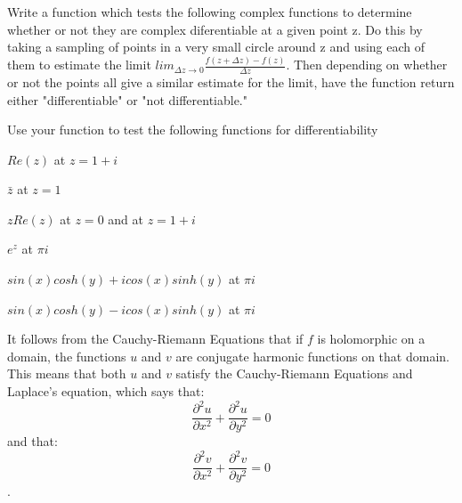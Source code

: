 \begin{problem}
Write a function which tests the following complex functions to determine whether or not they are complex diferentiable at a given point z. Do this by taking a sampling of points in a very small circle around z and using each of them to estimate the limit $lim_{\Delta z \to 0} \frac{f(z+\Delta z)-f(z)}{\Delta z}$. Then depending on whether or not the points all give a similar estimate for the limit, have the function return either "differentiable" or "not differentiable."

Use your function to test the following functions for differentiability

$Re(z)$ at $z=1+ i$

$\bar{z}$ at $z=1$

$z Re(z)$ at $z=0$ and at $z=1+ i$

$e^z$ at $\pi i$

$sin(x) cosh(y) + i cos(x) sinh(y)$ at $\pi i$

$sin(x) cosh(y) - i cos(x) sinh(y)$ at $\pi i$
\end{problem}

It follows from the Cauchy-Riemann Equations that if $f$ is holomorphic on a domain, the functions $u$ and $v$ are conjugate harmonic functions on that domain. This means that both $u$ and $v$ satisfy the Cauchy-Riemann Equations and Laplace's equation, which says that: $$\frac{\partial^2 u}{\partial x^2}+\frac{\partial^2 u}{\partial y^2}=0$$ and that: $$\frac{\partial^2 v}{\partial x^2}+\frac{\partial^2 v}{\partial y^2}=0$$.

\begin{comment}
\begin{problem}#No Proof problems
Prove that for $u$ and $v$ as defiined above, if $f$ is analytic on a domain, then $u$ and $v$ will be conjugate harmonic on that domain.
\end{problem}

\begin{problem}
Show that if Laplace's Equation is true for some function $f$ on a domain $D$ that for some conformal mapping $g$, Laplace's Equation will also hold on the image of $D$ under $g(f(z))$.
\end{problem}
\end{comment}

